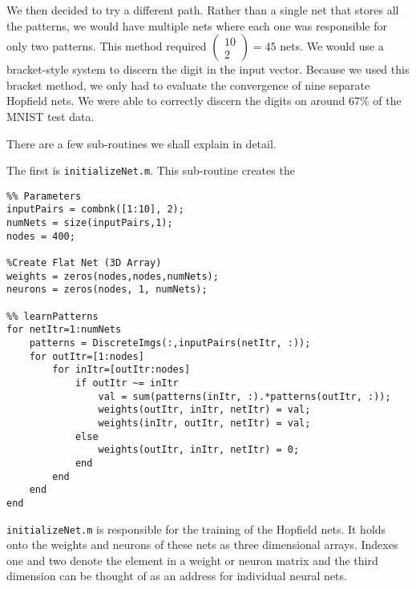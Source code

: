 \documentclass[]{article}
\theoremstyle{plain}
\theoremstyle{definition}
\begin{document}
We then decided to try a different path. Rather than a single net that stores all the patterns, we would have multiple nets where each one was responsible for only two patterns. This method required $ \left(\begin{array}{c}
10\\2
\end{array}\right) = 45 $ nets. We would use a bracket-style system to discern the digit in the input vector. Because we used this bracket method, we only had to evaluate the convergence of nine separate Hopfield nets. We were able to correctly discern the digits on around 67\% of the MNIST test data. 


\newpage
There are a few sub-routines we shall explain in detail. 

The first is \texttt{initializeNet.m}. This sub-routine creates the 

\singlespacing
\begin{verbatim}
%% Parameters
inputPairs = combnk([1:10], 2);
numNets = size(inputPairs,1);
nodes = 400;

%Create Flat Net (3D Array)
weights = zeros(nodes,nodes,numNets);
neurons = zeros(nodes, 1, numNets);

%% learnPatterns
for netItr=1:numNets
    patterns = DiscreteImgs(:,inputPairs(netItr, :));
    for outItr=[1:nodes] 
        for inItr=[outItr:nodes]
            if outItr ~= inItr
                val = sum(patterns(inItr, :).*patterns(outItr, :));
                weights(outItr, inItr, netItr) = val;
                weights(inItr, outItr, netItr) = val;
            else
                weights(outItr, inItr, netItr) = 0;
            end
        end
    end
end

\end{verbatim}
\doublespacing

\texttt{initializeNet.m} is responsible for the training of the Hopfield nets. It holds onto the weights and neurons of these nets as three dimensional arrays. Indexes one and two denote the element in a weight or neuron matrix and the third dimension can be thought of as an address for individual neural nets. 
\end{document}

